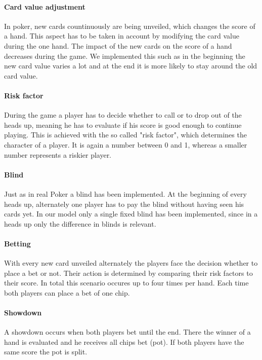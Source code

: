\documentclass[11pt]{article}
\begin{document}
\paragraph{Card value adjustment}
In poker, new cards countinuously are being unveiled, which changes the score of a hand. This aspect has to be taken in account by modifying the card value during the one hand. The impact of the new cards on the score of a hand decreases during the game. We implemented this such as in the beginning the new card value varies a lot and at the end it is more likely to stay around the old card value.

\paragraph{Risk factor}
During the game a player has to decide whether to call or to drop out of the heads up, meaning he has to evaluate if his score is good enough to continue playing. This is achieved with the so called "risk factor", which determines the character of a player. It is again a number between 0 and 1, whereas a smaller number represents a riskier player.

\paragraph{Blind}
Just as in real Poker a blind has been implemented. At the beginning of every heads up, alternately one player has to pay the blind without having seen his cards yet. In our model only a single fixed blind has been implemented, since in a heads up only the difference in  blinds is relevant.

\paragraph{Betting}
With every new card unveiled alternately the players face the decision whether to place a bet or not. Their action is determined by comparing their risk factors to their score. In total this scenario occures up to four times per hand. Each time both players can place a bet of one chip.

\paragraph{Showdown}
A showdown occurs when both players bet until the end. There the winner of a hand is evaluated and he receives all chips bet (pot). If both players have the same score the pot is split.
\end{document}
